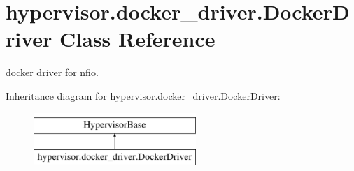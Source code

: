 \hypertarget{classhypervisor_1_1docker__driver_1_1DockerDriver}{\section{hypervisor.\-docker\-\_\-driver.\-Docker\-Driver Class Reference}
\label{classhypervisor_1_1docker__driver_1_1DockerDriver}
}


docker driver for nfio.  


Inheritance diagram for hypervisor.\-docker\-\_\-driver.\-Docker\-Driver\-:\begin{figure}[H]
\begin{center}
\leavevmode
\includegraphics[height=2.000000cm]{classhypervisor_1_1docker__driver_1_1DockerDriver}
\end{center}
\end{figure}
